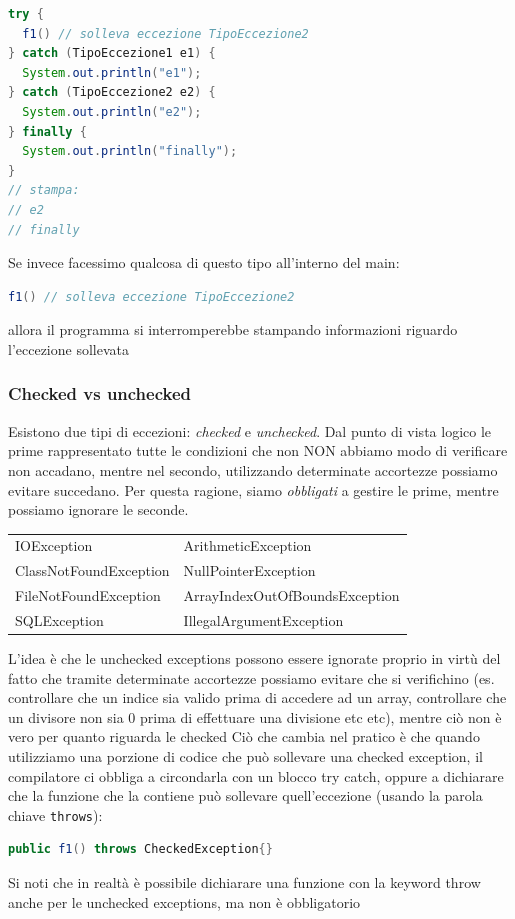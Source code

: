 \begin{lstlisting}[language = java, frame = none]
try {
  f1() // solleva eccezione TipoEccezione2
} catch (TipoEccezione1 e1) {
  System.out.println("e1");
} catch (TipoEccezione2 e2) {
  System.out.println("e2");
} finally {
  System.out.println("finally");
}
// stampa: 
// e2
// finally
\end{lstlisting}
Se invece facessimo qualcosa di questo tipo all'interno del main:
\begin{lstlisting}[language = java, frame = none]
f1() // solleva eccezione TipoEccezione2
\end{lstlisting}
allora il programma si interromperebbe stampando informazioni riguardo l'eccezione sollevata

\subsubsection{Checked vs unchecked}
Esistono due tipi di eccezioni: \textit{checked} e \textit{unchecked}. Dal punto di vista logico le prime rappresentato tutte le condizioni che non NON abbiamo modo di verificare non accadano, mentre nel secondo, utilizzando determinate accortezze possiamo evitare succedano. Per questa ragione, siamo \textit{obbligati} a gestire le prime, mentre possiamo ignorare le seconde.
\begin{center}
	\begin{tabular}{l l}
		\toprule
		\sfblue{Checked exceptions} & \sfblue{Unchecked exceptions}  \\
		\midrule
		IOException                 & ArithmeticException            \\
		ClassNotFoundException      & NullPointerException           \\
		FileNotFoundException       & ArrayIndexOutOfBoundsException \\
		SQLException                & IllegalArgumentException       \\
		\bottomrule
	\end{tabular}
\end{center}
L'idea è che le unchecked exceptions possono essere ignorate proprio in virtù del fatto che tramite determinate accortezze possiamo evitare che si verifichino (es. controllare che un indice sia valido prima di accedere ad un array, controllare che un divisore non sia 0 prima di effettuare una divisione etc etc), mentre ciò non è vero per quanto riguarda le checked
\vskip3mm
Ciò che cambia nel pratico è che quando utilizziamo una porzione di codice che può sollevare una checked exception, il compilatore ci obbliga a circondarla con un blocco try catch, oppure a dichiarare che la funzione che la contiene può sollevare quell'eccezione (usando la parola chiave \verb|throws|):
\begin{lstlisting}[language = java, frame = none]
public f1() throws CheckedException{}
\end{lstlisting}
Si noti che in realtà è possibile dichiarare una funzione con la keyword throw anche per le unchecked exceptions, ma non è obbligatorio

